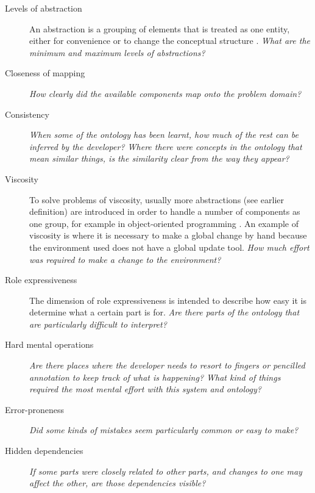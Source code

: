 \begin{description}
  \item[Levels of abstraction] 	\label{cdDef}
	An abstraction is a grouping of elements that is treated as one entity, either for convenience or to change the conceptual structure \cite{Green1996}. \emph{What are the minimum and maximum levels of abstractions?}
    \item[Closeness of mapping] \emph{How clearly did the available components map onto the problem domain?}
	\item[Consistency] \emph{When some of the ontology has been learnt, how much of the rest can be inferred by the developer? Where there were concepts in the ontology that mean similar things, is the similarity clear from the way they appear?}
	\item[Viscosity] To solve problems of viscosity, usually more abstractions (see earlier definition) are introduced in order to handle a number of components as one group, for example in object-oriented programming \cite{Green1996}. An example of viscosity is where it is necessary to make a global change by hand because the environment used does not have a global update tool. \emph{How much effort was required to make a change to the environment?}
	\item[Role expressiveness]
		The dimension of role expressiveness is intended to describe how easy it is determine what a certain part is for. \emph{Are there parts of the ontology that are particularly difficult to interpret?}
	\item[Hard mental operations] \emph{Are there places where the developer needs to resort to fingers or pencilled annotation to keep track of what is happening? What kind of things required the most mental effort with this system and ontology?}
	\item[Error-proneness] \emph{Did some kinds of mistakes seem particularly common or easy to make?}
	\item[Hidden dependencies] \emph{If some parts were closely related to other parts, and changes to one may affect the other, are those dependencies visible? }
\end{description}


 



